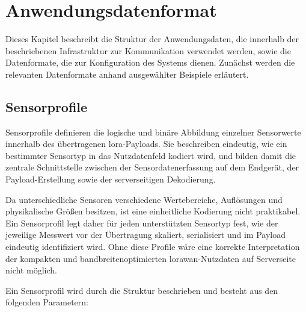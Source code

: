 %
%

\chapter{Anwendungsdatenformat}
	Dieses Kapitel beschreibt die Struktur der Anwendungsdaten, die innerhalb der beschriebenen Infrastruktur zur Kommunikation verwendet werden, sowie die Datenformate, die zur Konfiguration des Systems dienen. Zunächst werden die relevanten Datenformate anhand ausgewählter Beispiele erläutert.


\section{Sensorprofile \label{SA:SensorProfile}}
	
	Sensorprofile definieren die logische und binäre Abbildung einzelner Sensorwerte innerhalb des übertragenen \acs{lora}-Payloads. Sie beschreiben eindeutig, wie ein bestimmter Sensortyp in das Nutzdatenfeld kodiert wird, und bilden damit die zentrale Schnittstelle zwischen der Sensordatenerfassung auf dem Endgerät, der Payload-Erstellung sowie der serverseitigen Dekodierung.
	
	Da unterschiedliche Sensoren verschiedene Wertebereiche, Auflösungen und physikalische Grö{\ss}en besitzen, ist eine einheitliche Kodierung nicht praktikabel. Ein Sensorprofil legt daher für jeden unterstützten Sensortyp fest, wie der jeweilige Messwert vor der Übertragung skaliert, serialisiert und im Payload eindeutig identifiziert wird. Ohne diese Profile wäre eine korrekte Interpretation der kompakten und bandbreitenoptimierten \ac{lorawan}-Nutzdaten auf Serverseite nicht möglich.
	
	Ein Sensorprofil wird durch die Struktur  beschrieben und besteht aus den folgenden Parametern:
	
